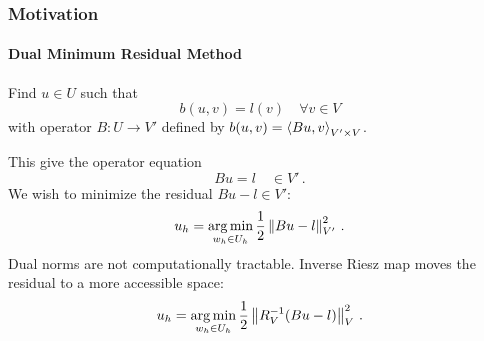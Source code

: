\documentclass[18pt,xcolor=table]{beamer}
\begin{document}




\begin{frame}[t]
\frametitle{Motivation}
\framesubtitle{Dual Minimum Residual Method}
Find $u\in U$ such that
\[
b(u,v)=l(v)\quad\forall v\in V
\]
with operator $B:U\rightarrow V'$ defined by $b(u,v)=\left\langle Bu,v \right\rangle_{V'\times V}$.

This give the operator equation 
\[
Bu=l\quad\in V'\,.
\]
We wish to minimize the residual $Bu-l\in V'$:
\[
u_h=\operatorname*{arg\,min}_{w_h\in U_h}\frac{1}{2}\left\| Bu-l \right\|^2_{V'}\,.
\]
Dual norms are not computationally tractable. 
Inverse Riesz map moves the residual to a more accessible space:
\[
u_h=\operatorname*{arg\,min}_{w_h\in U_h}\frac{1}{2}\left\| R_V^{-1}(Bu-l) \right\|^2_{V}\,.
\]
\end{frame}
\end{document}
